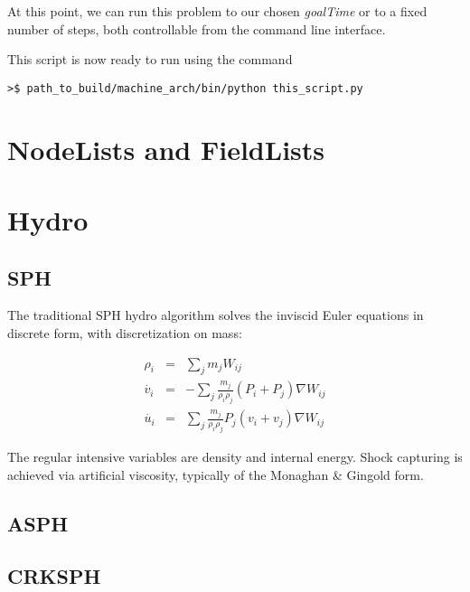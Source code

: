 \documentclass[11pt]{memoir}
\newcommand{\ba}{\begin{eqnarray}}
\newcommand{\ea}{\end{eqnarray}}
\begin{document}


At this point, we can run this problem to our chosen \textit{goalTime} or to a fixed number of steps, both controllable from the command line interface.



This script is now ready to run using the command

\lstset{basicstyle=\small,style=myCustomShellStyle}

\begin{lstlisting}
>$ path_to_build/machine_arch/bin/python this_script.py
\end{lstlisting} 

\chapter{NodeLists and FieldLists}

\chapter{Hydro}

\section{SPH}

The traditional SPH hydro algorithm solves the inviscid Euler equations in discrete form, with discretization on mass:

\ba
\rho_i &=& \sum_j m_j W_{ij}\\
\dot{v_i} &=& - \sum_j \frac{m_j}{\rho_i\rho_j}\left(P_i+P_j\right)\nabla W_{ij}\\
\dot{u_i} &=& \sum_j \frac{m_j}{\rho_i\rho_j}P_j\left(v_i+v_j\right)\nabla W_{ij}
\ea

The regular intensive variables are density and internal energy. 
Shock capturing is achieved via artificial viscosity, typically of the Monaghan \& Gingold form.



\section{ASPH}
\section{CRKSPH}
\end{document}
